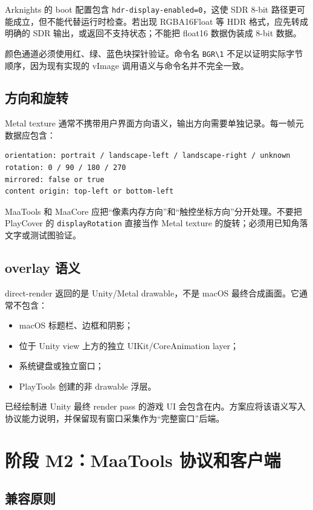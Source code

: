 \documentclass[UTF8,a4paper,11pt]{ctexart}
\begin{document}
Arknights 的 boot 配置包含 \texttt{hdr-display-enabled=0}，这使 SDR 8-bit 路径更可能成立，但不能代替运行时检查。若出现 RGBA16Float 等 HDR 格式，应先转成明确的 SDR 输出，或返回不支持状态；不能把 float16 数据伪装成 8-bit 数据。

颜色通道必须使用红、绿、蓝色块探针验证。命令名 \texttt{BGR\textbackslash{}1} 不足以证明实际字节顺序，因为现有实现的 vImage 调用语义与命令名并不完全一致。

\subsection{方向和旋转}

Metal texture 通常不携带用户界面方向语义，输出方向需要单独记录。每一帧元数据应包含：

\begin{lstlisting}
orientation: portrait / landscape-left / landscape-right / unknown
rotation: 0 / 90 / 180 / 270
mirrored: false or true
content origin: top-left or bottom-left
\end{lstlisting}

MaaTools 和 MaaCore 应把“像素内存方向”和“触控坐标方向”分开处理。不要把 PlayCover 的 \texttt{displayRotation} 直接当作 Metal texture 的旋转；必须用已知角落文字或测试图验证。

\subsection{overlay 语义}

direct-render 返回的是 Unity/Metal drawable，不是 macOS 最终合成画面。它通常不包含：

\begin{itemize}
  \item macOS 标题栏、边框和阴影；
  \item 位于 Unity view 上方的独立 UIKit/CoreAnimation layer；
  \item 系统键盘或独立窗口；
  \item PlayTools 创建的非 drawable 浮层。
\end{itemize}

已经绘制进 Unity 最终 render pass 的游戏 UI 会包含在内。方案应将该语义写入协议能力说明，并保留现有窗口采集作为“完整窗口”后端。

\section{阶段 M2：MaaTools 协议和客户端}

\subsection{兼容原则}
\end{document}

